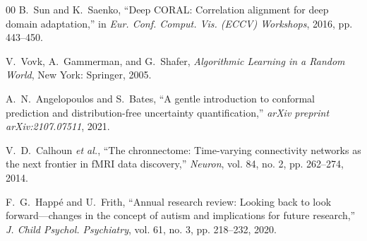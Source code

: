 \documentclass[journal]{IEEEtran}
\begin{document}
\begin{thebibliography}{00}
B.~Sun and K.~Saenko, ``Deep CORAL: Correlation alignment for deep domain adaptation,'' in \textit{Eur. Conf. Comput. Vis. (ECCV) Workshops}, 2016, pp. 443--450.

V.~Vovk, A.~Gammerman, and G.~Shafer, \textit{Algorithmic Learning in a Random World}, New York: Springer, 2005.

A.~N.~Angelopoulos and S.~Bates, ``A gentle introduction to conformal prediction and distribution-free uncertainty quantification,'' \textit{arXiv preprint arXiv:2107.07511}, 2021.

V.~D.~Calhoun \textit{et al.}, ``The chronnectome: Time-varying connectivity networks as the next frontier in fMRI data discovery,'' \textit{Neuron}, vol. 84, no. 2, pp. 262--274, 2014.

F.~G.~Happ{\'e} and U.~Frith, ``Annual research review: Looking back to look forward---changes in the concept of autism and implications for future research,'' \textit{J. Child Psychol. Psychiatry}, vol. 61, no. 3, pp. 218--232, 2020.

\end{thebibliography}
\end{document}

